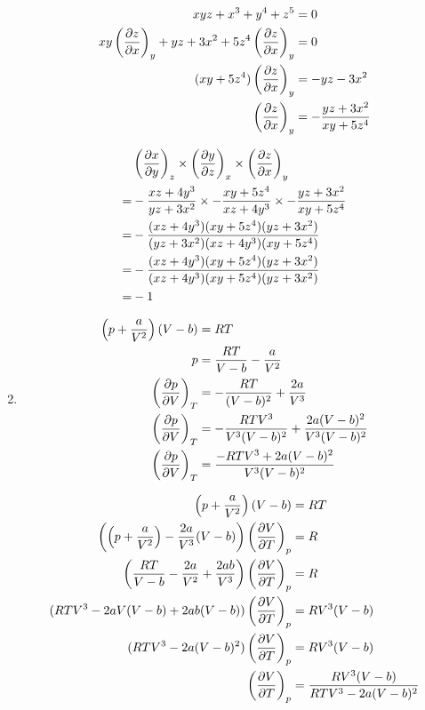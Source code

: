 \documentclass[10pt,\jkfside,a4paper]{article}
\begin{document}
\begin{enumerate}
\begin{equation}
\begin{split}
xyz + x^3 + y^4 + z^5 &= 0 \\
xy\left(\pdv{z}{x}\right)_y + yz + 3x^2 + 5z^4 \left(\pdv{z}{x}\right)_y &= 0 \\
(xy + 5z^4)\left(\pdv{z}{x}\right)_y &= -yz - 3x^2 \\
\left(\pdv{z}{x}\right)_y &= -\frac{yz + 3x^2}{xy + 5z^4} \\
\end{split}
\end{equation}

\begin{equation}
\begin{split}
 & \left(\pdv{x}{y}\right)_z \times \left(\pdv{y}{z}\right)_x \times \left(\pdv{z}{x}\right)_y \\
=& -\frac{xz + 4y^3}{yz + 3x^2} \times -\frac{xy + 5z^4}{xz + 4y^3} \times -\frac{yz + 3x^2}{xy + 5z^4} \\
=& -\frac{(xz + 4y^3)(xy + 5z^4)(yz + 3x^2)}{(yz + 3x^2)(xz + 4y^3)(xy + 5z^4)} \\
=& -\frac{(xz + 4y^3)(xy + 5z^4)(yz + 3x^2)}{(xz + 4y^3)(xy + 5z^4)(yz + 3x^2)} \\
=& -1 \\
\end{split}
\end{equation}

\item

\begin{equation}
\begin{split}
\left(p + \frac{a}{V^2}\right)(V - b) &= RT \\
p &= \frac{RT}{V - b} - \frac{a}{V^2}\\
\left(\pdv{p}{V}\right)_T &= -\frac{RT}{(V - b)^2} + \frac{2a}{V^3} \\
\left(\pdv{p}{V}\right)_T &= -\frac{RTV^3}{V^3(V - b)^2} + \frac{2a(V - b)^2}{V^3(V - b)^2} \\
\left(\pdv{p}{V}\right)_T &= \frac{- RTV^3 + 2a(V - b)^2}{V^3(V - b)^2} \\
\end{split}
\end{equation}

\begin{equation}
\begin{split}
\left(p + \frac{a}{V^2}\right)(V - b) &= RT \\
\left(\left(p + \frac{a}{V^2}\right)-\frac{2a}{V^3}(V - b)\right)\left(\pdv{V}{T}\right)_p &= R \\
\left(\frac{RT}{V - b} - \frac{2a}{V^2} + \frac{2ab}{V^3} \right)\left(\pdv{V}{T}\right)_p &= R \\
(RTV^3 - 2aV(V - b) + 2ab(V - b) )\left(\pdv{V}{T}\right)_p &= RV^3(V - b) \\
(RTV^3 - 2a(V - b)^2)\left(\pdv{V}{T}\right)_p &= RV^3(V - b) \\
\left(\pdv{V}{T}\right)_p &= \frac{RV^3(V - b)}{RTV^3 - 2a(V - b)^2} \\
\end{split}
\end{equation}


\end{enumerate}
\end{document}
